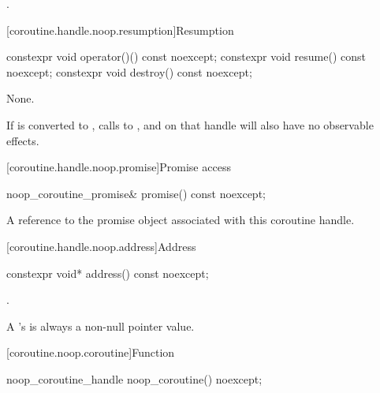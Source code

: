 \begin{itemdescr}
\pnum
\returns
{}.
\end{itemdescr}

[coroutine.handle.noop.resumption]{Resumption}

%
%
%
\begin{itemdecl}
constexpr void operator()() const noexcept;
constexpr void resume() const noexcept;
constexpr void destroy() const noexcept;
\end{itemdecl}

\begin{itemdescr}
\pnum
\effects
None.

\pnum
\remarks
If  is converted to ,
calls to ,  and  on that handle
will also have no observable effects.
\end{itemdescr}

[coroutine.handle.noop.promise]{Promise access}

%
\begin{itemdecl}
noop_coroutine_promise& promise() const noexcept;
\end{itemdecl}

\begin{itemdescr}
\pnum
\returns
A reference to the promise object associated with this
coroutine handle.
\end{itemdescr}

[coroutine.handle.noop.address]{Address}

%
\begin{itemdecl}
constexpr void* address() const noexcept;
\end{itemdecl}

\begin{itemdescr}
\pnum
\returns
{}.

\pnum
\remarks
A 's  is always a
non-null pointer value.
\end{itemdescr}

[coroutine.noop.coroutine]{Function }

%
\begin{itemdecl}
noop_coroutine_handle noop_coroutine() noexcept;
\end{itemdecl}

